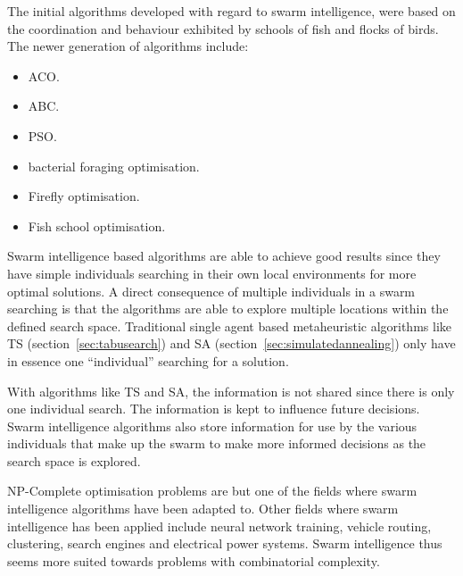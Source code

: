 The initial algorithms developed with regard to swarm intelligence, were based on the coordination and behaviour exhibited by schools of fish and flocks of birds. The newer generation of algorithms include\cite{SwarmArt,ChaoticSwarmIntel,BeeJobShop}:
\begin{itemize}
\item \gls{ACO}\cite{SwarmArt}.
\item \gls{ABC}\cite{BeeJobShop}.
\item \gls{PSO}\cite{ChaoticSwarmIntel}. 
\item bacterial foraging optimisation\cite{CompuIntelligenceIntro}.
\item Firefly optimisation\cite{CompuIntelligenceIntro}.
\item Fish school optimisation\cite{CompuIntelligenceIntro}.
\end{itemize}


Swarm intelligence based algorithms are able to achieve good results since they have simple individuals searching in their own local environments for more optimal solutions\cite{CompuIntelligenceIntro,FundamentalSwarm}. A direct consequence of multiple individuals in a swarm searching is that the algorithms are able to explore multiple locations within the defined search space\cite{CompuIntelligenceIntro,FundamentalSwarm}. Traditional single agent based metaheuristic algorithms like \gls{TS} (section~\ref{sec:tabusearch}) and \gls{SA} (section~\ref{sec:simulatedannealing}) only have in essence one ``individual'' searching for a solution\cite{CompuIntelligenceIntro,FundamentalSwarm}. 

With algorithms like \gls{TS} and \gls{SA}, the information is not shared since there is only one individual search\cite{CompuIntelligenceIntro,FundamentalSwarm,SASingleMultiObj,TSHazardous}. The information is kept to influence future decisions\cite{AIModernApproach,TabuMontemanniSmith,TabuVechicleRoutingWithTimeWindows,CurveFittingSA,EcoEquilSA}. Swarm intelligence algorithms also store information for use by the various individuals that make up the swarm to make more informed decisions as the search space is explored\cite{CompuIntelligenceIntro,FundamentalSwarm}.

NP-Complete optimisation problems are but one of the fields where swarm intelligence algorithms have been adapted to. Other fields where swarm intelligence has been applied include neural network training\cite{CompuIntelligenceIntro}, vehicle routing\cite{ACOSurvey}, clustering\cite{AntSwarmClustering}, search engines and electrical power systems\cite{SAElectricPower}. Swarm intelligence thus seems more suited towards problems with combinatorial complexity\cite{SIOPDenby}.

